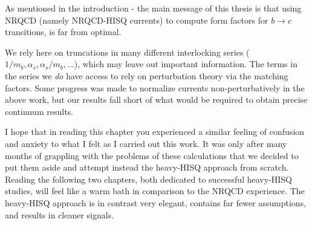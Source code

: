 As mentioned in the introduction - the main message of this thesis is that using NRQCD (namely NRQCD-HISQ currents) to compute form factors for $b\to c$ transitions, is far from optimal. 

We rely here on truncations in many different interlocking series ($1/m_b, \alpha_s,\alpha_s/m_b,...$), which may leave out important information. The terms in the series we {\textit{do}} have access to rely on perturbation theory via the matching factors. Some progress was made to normalize currents non-perturbatively in the above work, but our results fall short of what would be required to obtain precise continuum results.

I hope that in reading this chapter you experienced a similar feeling of confusion and anxiety to what I felt as I carried out this work. It was only after many months of grappling with the problems of these calculations that we decided to put them aside and attempt instead the heavy-HISQ approach from scratch. Reading the following two chapters, both dedicated to successful heavy-HISQ studies, will feel like a warm bath in comparison to the NRQCD experience. The heavy-HISQ approach is in contrast very elegant, contains far fewer assumptions, and results in cleaner signals.
